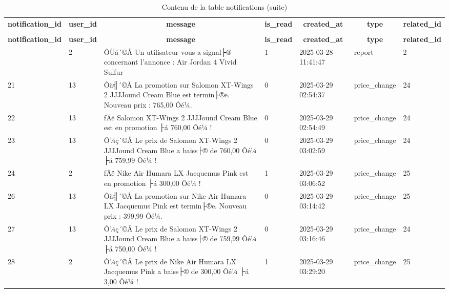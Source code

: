 %
%
 \begin{longtable}{|l|l|l|l|l|l|l|} 
 \hline \endhead \hline \endfoot \hline 
 \caption{Contenu de la table notifications} \label{tab:notifications-data} \\\hline \multicolumn{1}{|c|}{\textbf{notification\_id}} & \multicolumn{1}{|c|}{\textbf{user\_id}} & \multicolumn{1}{|c|}{\textbf{message}} & \multicolumn{1}{|c|}{\textbf{is\_read}} & \multicolumn{1}{|c|}{\textbf{created\_at}} & \multicolumn{1}{|c|}{\textbf{type}} & \multicolumn{1}{|c|}{\textbf{related\_id}} \\ \hline \hline  \endfirsthead 
\caption{Contenu de la table notifications (suite)} \\ \hline \multicolumn{1}{|c|}{\textbf{notification\_id}} & \multicolumn{1}{|c|}{\textbf{user\_id}} & \multicolumn{1}{|c|}{\textbf{message}} & \multicolumn{1}{|c|}{\textbf{is\_read}} & \multicolumn{1}{|c|}{\textbf{created\_at}} & \multicolumn{1}{|c|}{\textbf{type}} & \multicolumn{1}{|c|}{\textbf{related\_id}} \\ \hline \hline \endhead \endfoot
20 & 2 & ÔÜá´©Å Un utilisateur vous a signal├® concernant l'annonce : Air Jordan 4 Vivid Sulfur & 1 & 2025-03-28 11:41:47 & report & 2 \\ \hline 
21 & 13 & Ôä╣´©Å La promotion sur Salomon XT-Wings 2 JJJJound Cream Blue est termin├®e. Nouveau prix : 765,00 Ôé¼. & 0 & 2025-03-29 02:54:37 & price\_change & 24 \\ \hline 
22 & 13 & ­ƒÄë Salomon XT-Wings 2 JJJJound Cream Blue est en promotion ├á 760,00 Ôé¼ ! & 0 & 2025-03-29 02:54:49 & price\_change & 24 \\ \hline 
23 & 13 & Ô¼ç´©Å Le prix de Salomon XT-Wings 2 JJJJound Cream Blue a baiss├® de 760,00 Ôé¼ ├á 759,99 Ôé¼ ! & 0 & 2025-03-29 03:02:59 & price\_change & 24 \\ \hline 
24 & 2 & ­ƒÄë Nike Air Humara LX Jacquemus Pink est en promotion ├á 300,00 Ôé¼ ! & 1 & 2025-03-29 03:06:52 & price\_change & 25 \\ \hline 
26 & 13 & Ôä╣´©Å La promotion sur Nike Air Humara LX Jacquemus Pink est termin├®e. Nouveau prix : 399,99 Ôé¼. & 0 & 2025-03-29 03:14:42 & price\_change & 25 \\ \hline 
27 & 13 & Ô¼ç´©Å Le prix de Salomon XT-Wings 2 JJJJound Cream Blue a baiss├® de 759,99 Ôé¼ ├á 750,00 Ôé¼ ! & 0 & 2025-03-29 03:16:46 & price\_change & 24 \\ \hline 
28 & 2 & Ô¼ç´©Å Le prix de Nike Air Humara LX Jacquemus Pink a baiss├® de 300,00 Ôé¼ ├á 3,00 Ôé¼ ! & 1 & 2025-03-29 03:29:20 & price\_change & 25 \\ \hline 

\end{longtable}

